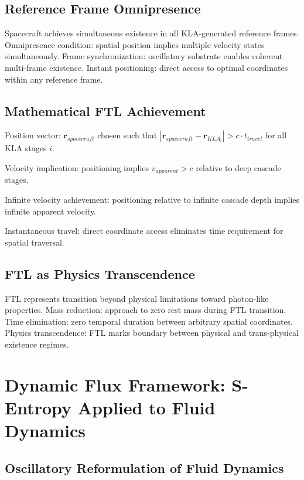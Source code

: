 \documentclass[12pt,a4paper]{article}
\begin{document}
\subsection{Reference Frame Omnipresence}

Spacecraft achieves simultaneous existence in all KLA-generated reference frames. Omnipresence condition: spatial position implies multiple velocity states simultaneously. Frame synchronization: oscillatory substrate enables coherent multi-frame existence. Instant positioning: direct access to optimal coordinates within any reference frame.

\subsection{Mathematical FTL Achievement}

Position vector: $\mathbf{r}_{spacecraft}$ chosen such that $|\mathbf{r}_{spacecraft} - \mathbf{r}_{KLA_i}| > c \cdot t_{travel}$ for all KLA stages $i$.

Velocity implication: positioning implies $v_{apparent} > c$ relative to deep cascade stages.

Infinite velocity achievement: positioning relative to infinite cascade depth implies infinite apparent velocity.

Instantaneous travel: direct coordinate access eliminates time requirement for spatial traversal.

\subsection{FTL as Physics Transcendence}

FTL represents transition beyond physical limitations toward photon-like properties. Mass reduction: approach to zero rest mass during FTL transition. Time elimination: zero temporal duration between arbitrary spatial coordinates. Physics transcendence: FTL marks boundary between physical and trans-physical existence regimes.

\section{Dynamic Flux Framework: S-Entropy Applied to Fluid Dynamics}

\subsection{Oscillatory Reformulation of Fluid Dynamics}
\end{document}
